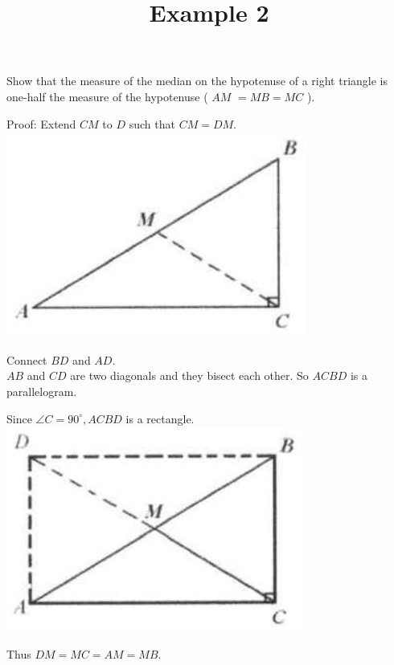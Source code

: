 \documentclass{article}
\title{Example 2}
\date{}
\begin{document}
\maketitle

Show that the measure of the median on the hypotenuse of a right triangle is one-half the measure of the hypotenuse ( \(A M\) \(=M B=M C\) ).

Proof:
Extend \(C M\) to \(D\) such that \(C M=D M\).\\
\centering
\includegraphics[width=\textwidth]{images/problem_image_1.jpg}

Connect \(B D\) and \(A D\).\\
\(A B\) and \(C D\) are two diagonals and they bisect each other. So \(A C B D\) is a parallelogram.

Since \(\angle C=90^{\circ}, A C B D\) is a rectangle.\\
\centering
\includegraphics[width=\textwidth]{images/reasoning_image_1.jpg}

Thus \(D M=M C=A M=M B\).
\end{document}
